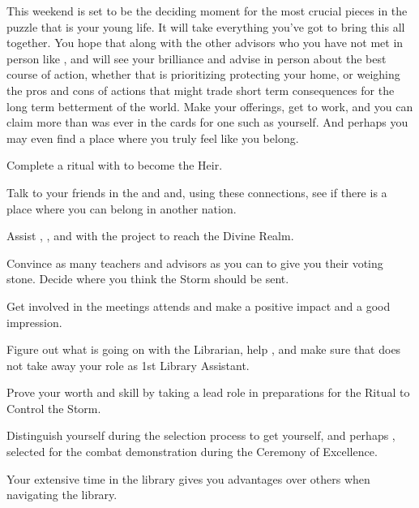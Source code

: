 \documentclass[char]{GL2020}
\begin{document}
This weekend is set to be the deciding moment for the most crucial pieces in the puzzle that is your young life. It will take everything you've got to bring this all together. You hope that \cDiplomat{} along with the other advisors who you have not met in person like \cAntiChup{}, and \cAssistantScientist{\full}will see your brilliance and advise in person about the best course of action, whether that is prioritizing protecting your home, or weighing the pros and cons of actions that might trade short term consequences for the long term betterment of the world. Make your offerings, get to work, and you can claim more than was ever in the cards for one such as yourself. And perhaps you may even find a place where you truly feel like you belong.  

\begin{itemz}
    \item Complete a ritual with \cHeir{} to become the \cHeir{\formal} Heir.
    \item Talk to your friends in the \pShip{} and \pFarm{} and, using these connections, see if there is a place where you can belong in another nation.
    \item Assist \cFlowPriest{}, \cCurse{}, and \cAssistantScientist{} with the project to reach the Divine Realm.
    \item Convince as many teachers and advisors as you can to give you their voting stone. Decide where you think the Storm should be sent. 
    \item Get involved in the meetings \cDiplomat{} attends and make a positive impact and a good impression.
    \item Figure out what is going on with the Librarian, help \cLibrarian{\them}, and make sure that \cLibAssist{} does not take away your role as 1st Library Assistant.
    \item Prove your worth and skill by taking a lead role in preparations for the Ritual to Control the Storm.
    \item Distinguish yourself during the selection process to get yourself, and perhaps \cChupStudent{}, selected for the combat demonstration during the Ceremony of Excellence.
\end{itemz}
\item 

\begin{itemz}[Notes]
    \item Your extensive time in the library gives you advantages over others when navigating the library.
\end{itemz}
\end{document}
